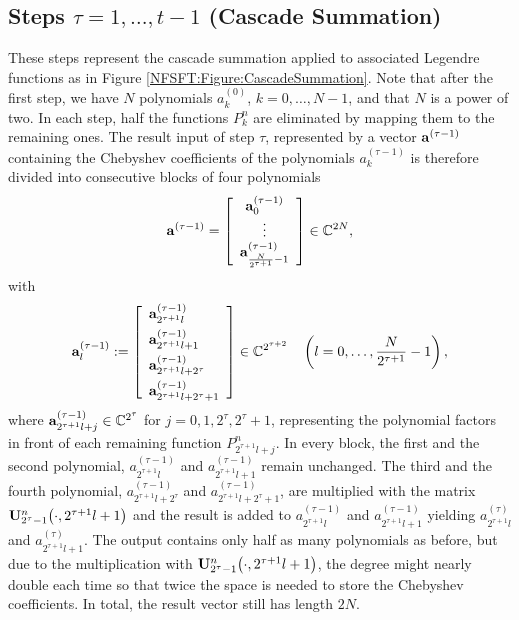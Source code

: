 \subsection[Cascade Summation]{Steps $\tau = 1,\ldots,t-1$ (Cascade Summation)}
These steps represent the cascade summation applied to associated Legendre functions as in Figure 
\ref{NFSFT:Figure:CascadeSummation}. Note that after the first step, we have $N$ polynomials $a_{k}^{(0)}$,
$k=0,\ldots,N-1$, and that $N$ is a power of two. In each step, half the functions $P_{k}^n$ are eliminated 
by mapping them to the remaining ones. The result input of step $\tau$, represented by a vector $\mathbf{a}^{(\tau-1)}$ 
containing the Chebyshev coefficients of the polynomials $a_{k}^{(\tau-1)}$ is therefore divided into 
consecutive blocks of four polynomials
\[
  \mathbf{a}^{(\tau-1)} = 
    \left[\begin{array}{c}
      \mathbf{a}^{(\tau-1)}_{0}\\
      \vdots\\
      \mathbf{a}^{(\tau-1)}_{\frac{N}{2^{\tau+1}}-1}
    \end{array}\right]  \in \mathbb{C}^{2N},
\]
with
\begin{equation}
  \nonumber
  \mathbf{a}^{(\tau-1)}_{l} := 
    \left[\begin{array}{l}
      \mathbf{a}^{(\tau-1)}_{2^{\tau+1}l}\\[1ex]
      \mathbf{a}^{(\tau-1)}_{2^{\tau+1}l+1}\\[1ex]
      \mathbf{a}^{(\tau-1)}_{2^{\tau+1}l+2^{\tau}}\\[1ex]
      \mathbf{a}^{(\tau-1)}_{2^{\tau+1}l+2^{\tau}+1}
    \end{array}\right] \in \mathbb{C}^{2^{\tau+2}} \quad \left(l=0,\ldots,\frac{N}{2^{\tau+1}}-1\right),
\end{equation}
where $\mathbf{a}^{(\tau-1)}_{2^{\tau+1}l+j} \in \mathbb{C}^{2^{\tau}}$ for $j = 0,1,2^{\tau},2^{\tau}+1$, representing the polynomial 
factors in front of each remaining function $P_{2^{\tau+1}l+j}^n$. 
In every block, the first and the second polynomial, $a^{(\tau-1)}_{2^{\tau+1}l}$
and $a^{(\tau-1)}_{2^{\tau+1}l+1}$ remain unchanged. The third and the fourth polynomial, $a^{(\tau-1)}_{2^{\tau+1}l+2^{\tau}}$ 
and $a^{(\tau-1)}_{2^{\tau+1}l+2^{\tau}+1}$, are multiplied with the matrix $\mathbf{U}_{2^{\tau}-1}^{n}{\hspace{-0.4ex}}\left(\cdot,2^{\tau+1}l+1\right)$ 
and the result is added to $a^{(\tau-1)}_{2^{\tau+1}l}$ and $a^{(\tau-1)}_{2^{\tau+1}l+1}$ yielding $a^{(\tau)}_{2^{\tau+1}l}$ and $a^{(\tau)}_{2^{\tau+1}l+1}$. The output contains 
only half as many polynomials as before, but due to the multiplication with $\mathbf{U}_{2^{\tau}-1}^{n}{\hspace{-0.4ex}}\left(\cdot,2^{\tau+1}l+1\right)$, 
the degree might nearly double each time so that twice the space is needed to store the Chebyshev coefficients. In total, the result vector still has length $2N$. 
 
